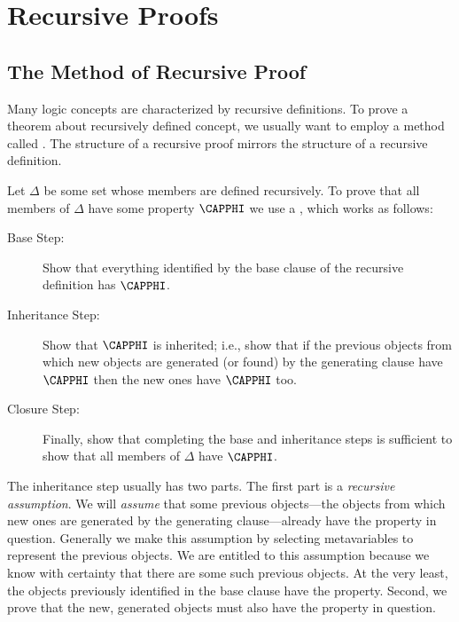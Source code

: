 \section{Recursive Proofs}\label{Recursive Proofs}

\subsection{The Method of Recursive Proof}
Many logic concepts are characterized by recursive definitions.  
To prove a theorem about recursively defined concept, we usually want to employ a method called . 
The structure of a recursive proof mirrors the structure of a recursive definition.

\begin{majorILnc}{}
	Let $\Delta$ be some set whose members are defined recursively. To prove that all members of $\Delta$ have some property $\CAPPHI$ we use a , which works as follows:
	\begin{description}
		\item[Base Step:] Show that everything identified by the base clause of the recursive definition has $\CAPPHI$.  
		\item[Inheritance Step:] Show that $\CAPPHI$ is inherited; i.e., show that if the previous objects from which new objects are generated (or found) by the generating clause have $\CAPPHI$ then the new ones have $\CAPPHI$ too.
		\item[Closure Step:] Finally, show that completing the base and inheritance steps is sufficient to show that all members of $\Delta$ have $\CAPPHI$. 
		
	\end{description}
\end{majorILnc}
The inheritance step usually has two parts. The first part is a \emph{recursive assumption}.  We will \emph{assume} that some previous objects---the objects from which new ones are generated by the generating clause---already have the property in question.  Generally we make this assumption by selecting metavariables to represent the previous objects.  We are entitled to this assumption because we know with certainty that there are some such previous objects.  At the very least, the objects previously identified in the base clause have the property.  Second, we prove that the new, generated objects must also have the property in question.

